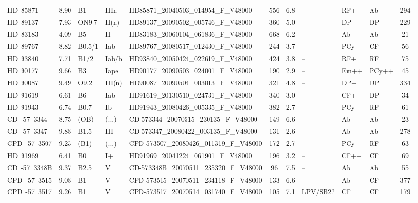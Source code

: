 {\begin{landscape}
\begin{longtable}{lclllcclllc}
\noalign{\smallskip}
HD~85871 & 8.90 & B1 & IIIn & HD85871\_20040503\_014954\_F\_V48000 & 556 & 6.8 & -- & RF+ & Ab & 294 \\
\noalign{\smallskip}
HD~89137 & 7.93 & ON9.7 & II(n) & HD89137\_20090502\_005746\_F\_V48000 & 360 & 5.0 & -- & DP+ & DP & 229 \\
\noalign{\smallskip}
HD~83183 & 4.09 & B5 & II & HD83183\_20060104\_061836\_F\_V48000 & 668 & 6.2 & -- & Ab & Ab & 21 \\
\noalign{\smallskip}
HD~89767 & 8.82 & B0.5/1 & Iab & HD89767\_20080517\_012430\_F\_V48000 & 244 & 3.7 & -- & PCy & CF & 56 \\
\noalign{\smallskip}
HD~93840 & 7.71 & B1/2 & Iab/b & HD93840\_20050424\_022619\_F\_V48000 & 424 & 3.8 & -- & RF+ & RF & 75 \\
\noalign{\smallskip}
HD~90177 & 9.66 & B3 & Iape & HD90177\_20090503\_024001\_F\_V48000 & 190 & 2.9 & -- & Em++ & PCy++ & 45 \\
\noalign{\smallskip}
HD~90087 & 9.49 & O9.2 & III(n) & HD90087\_20090504\_003013\_F\_V48000 & 321 & 4.8 & -- & DP+ & DP & 334 \\
\noalign{\smallskip}
HD~91619 & 6.61 & B6 & Iab & HD91619\_20130510\_024731\_F\_V48000 & 340 & 3.0 & -- & CF++ & DP & 34 \\
\noalign{\smallskip}
HD~91943 & 6.74 & B0.7 & Ib & HD91943\_20080426\_005335\_F\_V48000 & 382 & 2.7 & -- & PCy & RF & 61 \\
\noalign{\smallskip}
CD~-57~3344 & 8.75 & (OB) & (...) & CD-573344\_20070515\_230135\_F\_V48000 & 149 & 6.6 & -- & Ab & Ab & 23 \\
\noalign{\smallskip}
CD~-57~3347 & 9.88 & B1.5 & III & CD-573347\_20080422\_003135\_F\_V48000 & 131 & 2.6 & -- & Ab & Ab & 278 \\
\noalign{\smallskip}
CPD~-57~3507 & 9.23 & (B1) & (...) & CPD-573507\_20080426\_011319\_F\_V48000 & 172 & 2.7 & -- & PCy & RF & 63 \\
\noalign{\smallskip}
HD~91969 & 6.41 & B0 & I+ & HD91969\_20041224\_061901\_F\_V48000 & 196 & 3.2 & -- & CF++ & CF & 69 \\
\noalign{\smallskip}
CD~-57~3348B & 9.37 & B2.5 & V & CD-573348B\_20070511\_235320\_F\_V48000 & 96 & 7.5 & -- & Ab & Ab & 55 \\
\noalign{\smallskip}
CPD~-57~3515 & 9.08 & B1 & V & CPD-573515\_20070511\_234118\_F\_V48000 & 133 & 6.6 & -- & Ab & CF & 377 \\
\noalign{\smallskip}
CPD~-57~3517 & 9.26 & B1 & V & CPD-573517\_20070514\_031740\_F\_V48000 & 105 & 7.1 & LPV/SB2? & CF & CF & 179 \\

\end{longtable}
\end{landscape}}
